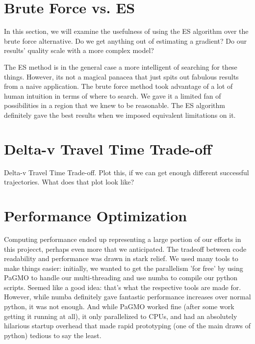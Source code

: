 

\section{Brute Force vs. ES}
In this section, we will examine the usefulness of using the ES algorithm over the brute force alternative. Do we get anything out of estimating a gradient? Do our results’ quality scale with a more complex model?

The ES method is in the general case a more intelligent of searching for these things. However, its not a magical panacea that just spits out fabulous results from a naive application. The brute force method took advantage of a lot of human intuition in terms of where to search. We gave it a limited fan of possibilities in a region that we knew to be reasonable. The ES algorithm definitely gave the best results when we imposed equivalent limitations on it.

\section{Delta-v Travel Time Trade-off}
Delta-v Travel Time Trade-off. Plot this, if we can get enough different successful trajectories. What does that plot look like?

\section{Performance Optimization}
Computing performance ended up representing a large portion of our efforts in this projecct, perhaps even more that we anticipated. The tradeoff between code readability and performance was drawn in stark relief. We used many tools to make things easier: initially, we wanted to get the parallelism 'for free' by using PaGMO to handle our multi-threading and use numba to compile our python scripts. Seemed like a good idea: that's what the respective tools are made for. However, while numba definitely gave fantastic performance increases over normal python, it was not enough. And while PaGMO worked fine (after some work getting it running at all), it only parallelized to CPUs, and had an absolutely hilarious startup overhead that made rapid prototyping (one of the main draws of python) tedious to say the least. 

